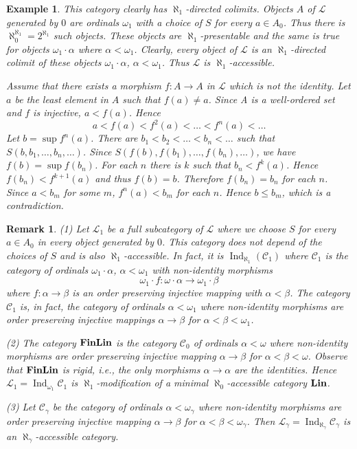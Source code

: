 \documentclass[12pt]{amsart}
\newtheorem{rem}[theo]{Remark}
\newtheorem{exam}[theo]{Example}
\newcommand\Ind{\operatorname{Ind}}
\newcommand\Lin{\operatorname{\bf Lin}}
\newcommand\FinLin{\operatorname{\bf FinLin}}
\newcommand\cc{\mathcal {C}}
\newcommand\cl{\mathcal {L}}
\begin{document}
\begin{exam}
{This category clearly has $\aleph_1$-directed colimits. Objects $A$ of $\cl$ generated by $0$ are ordinals $\omega_1$ with a choice of $S$ for every $a\in A_0$. Thus there is $\aleph_0^{\aleph_1}=2^{\aleph_1}$ such objects. These objects are
$\aleph_1$-presentable and the same is true for objects $\omega_1\cdot\alpha$ where $\alpha<\omega_1$. Clearly, every object
of $\cl$ is an $\aleph_1$-directed colimit of these objects $\omega_1\cdot\alpha$, $\alpha<\omega_1$. Thus $\cl$ is 
$\aleph_1$-accessible.

Assume that there exists a morphism $f:A\to A$ in $\cl$ which is not the identity. Let $a$ be the least element in $A$ such that $f(a)\neq a$.
Since A is a well-ordered set and $f$ is injective, $a<f(a)$. Hence
$$
a<f(a)<f^2(a)<\dots <f^n(a)<\dots
$$
Let $b=\sup f^n(a)$. There are $b_1<b_2<\dots <b_n<\dots$ such that $S(b,b_1,\dots,b_n,\dots)$. Since $S(f(b),f(b_1),\dots,f(b_n),\dots)$,
we have $f(b)=\sup f(b_n)$. For each $n$ there is $k$ such that $b_n<f^k(a)$. Hence $f(b_n)<f^{k+1}(a)$ and thus $f(b)=b$. Therefore $f(b_n)=b_n$
for each $n$. Since $a<b_m$ for some $m$, $f^n(a)<b_m$ for each $n$. Hence $b\leq b_m$, which is a contradiction.
}
\end{exam}

\begin{rem}
{
\em
(1) Let $\cl_1$ be a full subcategory of $\cl$ where we choose $S$ for every $a\in A_0$ in every object generated by $0$.  This category does not depend of the choices of $S$ and is also $\aleph_1$-accessible. In fact, it is $\Ind_{\aleph_1}(\cc_1)$ where
$\cc_1$ is the category of ordinals $\omega_1\cdot\alpha$, $\alpha<\omega_1$ with non-identity morphisms 
$$
\omega_1\cdot f:\omega\cdot\alpha\to\omega_1\cdot\beta
$$
where $f:\alpha\to\beta$ is an order preserving injective mapping with $\alpha<\beta$. The category $\cc_1$ is, in fact,
the category of ordinals $\alpha<\omega_1$ where non-identity morphisms are order preserving injective mappings $\alpha\to\beta$
for $\alpha<\beta<\omega_1$.

(2) The category $\FinLin$ is the category $\cc_0$ of ordinals $\alpha<\omega$ where non-identity morphisms are order preserving
injective mapping $\alpha\to\beta$ for $\alpha<\beta<\omega$. Observe that $\FinLin$ is rigid, i.e., the only morphisms
$\alpha\to\alpha$ are the identities. Hence $\cl_1=\Ind_{\omega_1} \cc_1$ is $\aleph_1$-modification of a minimal $\aleph_0$-accessible category $\Lin$.

(3) Let $\cc_\gamma$ be the category of ordinals $\alpha<\omega_\gamma$ where non-identity morphisms are order preserving
injective mapping $\alpha\to\beta$ for $\alpha<\beta<\omega_\gamma$. Then $\cl_\gamma = \Ind_{\aleph_\gamma}\cc_\gamma$ is
an $\aleph_\gamma$-accessible category.
}
\end{rem}
\end{document}
